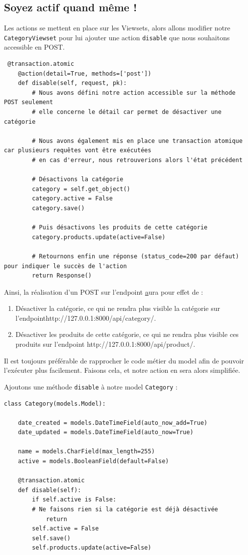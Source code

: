 \documentclass[a4paper]{article}
\begin{document}
\subsection{Soyez actif quand même !}
Les actions se mettent en place sur les Viewsets, alors allons modifier notre {\tt CategoryViewset}  pour lui ajouter une action {\tt disable}  que nous souhaitons accessible en POST.
\begin{verbatim}
 @transaction.atomic
    @action(detail=True, methods=['post'])
    def disable(self, request, pk):
        # Nous avons défini notre action accessible sur la méthode POST seulement
        # elle concerne le détail car permet de désactiver une catégorie

        # Nous avons également mis en place une transaction atomique car plusieurs requêtes vont être exécutées
        # en cas d'erreur, nous retrouverions alors l'état précédent

        # Désactivons la catégorie
        category = self.get_object()
        category.active = False
        category.save()

        # Puis désactivons les produits de cette catégorie
        category.products.update(active=False)

        # Retournons enfin une réponse (status_code=200 par défaut) pour indiquer le succès de l'action
        return Response()
\end{verbatim}
Ainsi, la réalisation d’un POST sur l'endpoint \href{http://127.0.0.1:8000/api/category/2/disable/}  aura pour effet de :
\begin{enumerate}
\item Désactiver la {\color{monOrange}catégorie}, ce qui ne rendra plus visible la catégorie sur l'endpointhttp://127.0.0.1:8000/api/category/.
\item Désactiver {\color{monOrange}les produits de cette catégorie}, ce qui ne rendra plus visible ces produits sur l'endpoint http://127.0.0.1:8000/api/product/.
\end{enumerate}
\begin{theorem}
Il est toujours préférable de rapprocher le code métier du model afin de pouvoir l’exécuter plus facilement. Faisons cela, et notre action en sera alors simplifiée.
\end{theorem}
Ajoutons une méthode {\tt disable}  à notre model {\tt Category}  :
\begin{verbatim}
class Category(models.Model):
 
    date_created = models.DateTimeField(auto_now_add=True)
    date_updated = models.DateTimeField(auto_now=True)
 
    name = models.CharField(max_length=255)
    active = models.BooleanField(default=False)
 
    @transaction.atomic
    def disable(self):
        if self.active is False:
        # Ne faisons rien si la catégorie est déjà désactivée
            return
        self.active = False
        self.save()
        self.products.update(active=False)
\end{verbatim}
\end{document}
